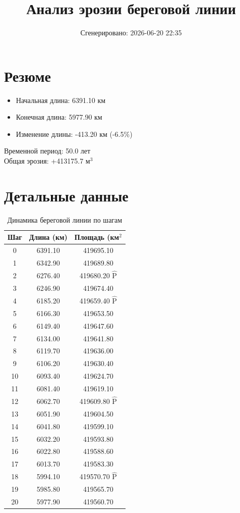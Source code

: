 \documentclass{article}
\title{Анализ эрозии береговой линии}
\author{Сгенерировано: 2026-06-20 22:35}
\date{}
\begin{document}
\maketitle

\section{Резюме}
\begin{itemize}
  \item Начальная длина: 6391.10 км
  \item Конечная длина: 5977.90 км
  \item Изменение длины: -413.20 км (-6.5\%)
\end{itemize}
Временной период: 50.0 лет\\

Общая эрозия: +413175.7 м$^3$\\

\section{Детальные данные}

\begin{table}[h]
\centering
\begin{tabular}{|c|c|c|}
\hline
Шаг & Длина (км) & Площадь (км$^2$ \\ 
\hline
0 & 6391.10 & 419695.10 \\ 
\hline
1 & 6342.90 & 419689.80 \\ 
\hline
2 & 6276.40 & 419680.20 $\hat{\text{P}}$ \\ 
\hline
3 & 6246.90 & 419674.40 \\ 
\hline
4 & 6185.20 & 419659.40 $\hat{\text{P}}$ \\ 
\hline
5 & 6166.30 & 419653.50 \\ 
\hline
6 & 6149.40 & 419647.60 \\ 
\hline
7 & 6134.00 & 419641.80 \\ 
\hline
8 & 6119.70 & 419636.00 \\ 
\hline
9 & 6106.20 & 419630.40 \\ 
\hline
10 & 6093.40 & 419624.70 \\ 
\hline
11 & 6081.40 & 419619.10 \\ 
\hline
12 & 6062.70 & 419609.80 $\hat{\text{P}}$ \\ 
\hline
13 & 6051.90 & 419604.50 \\ 
\hline
14 & 6041.80 & 419599.10 \\ 
\hline
15 & 6032.20 & 419593.80 \\ 
\hline
16 & 6022.80 & 419588.60 \\ 
\hline
17 & 6013.70 & 419583.30 \\ 
\hline
18 & 5994.10 & 419570.70 $\hat{\text{P}}$ \\ 
\hline
19 & 5985.80 & 419565.70 \\ 
\hline
20 & 5977.90 & 419560.70 \\ 
\hline
\end{tabular}
\caption{Динамика береговой линии по шагам}
\end{table}
\end{document}
